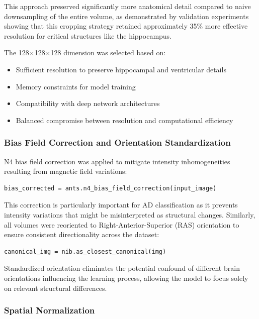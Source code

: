 \documentclass[12pt, a4paper]{article}
\begin{document}
This approach preserved significantly more anatomical detail compared to naive downsampling of the entire volume, as demonstrated by validation experiments showing that this cropping strategy retained approximately 35\% more effective resolution for critical structures like the hippocampus.


The 128$\times$128$\times$128 dimension was selected based on:
\begin{itemize}
    \item Sufficient resolution to preserve hippocampal and ventricular details
    \item Memory constraints for model training
    \item Compatibility with deep network architectures
    \item Balanced compromise between resolution and computational efficiency
\end{itemize}

\subsubsection{Bias Field Correction and Orientation Standardization}

N4 bias field correction was applied to mitigate intensity inhomogeneities resulting from magnetic field variations:

\begin{verbatim}
bias_corrected = ants.n4_bias_field_correction(input_image)
\end{verbatim}

This correction is particularly important for AD classification as it prevents intensity variations that might be misinterpreted as structural changes. Similarly, all volumes were reoriented to Right-Anterior-Superior (RAS) orientation to ensure consistent directionality across the dataset:

\begin{verbatim}
canonical_img = nib.as_closest_canonical(img)
\end{verbatim}

Standardized orientation eliminates the potential confound of different brain orientations influencing the learning process, allowing the model to focus solely on relevant structural differences.

\subsubsection{Spatial Normalization}
\end{document}

